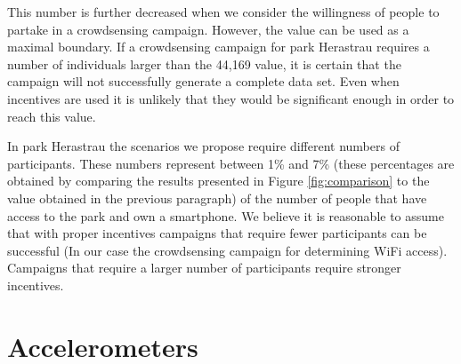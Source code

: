 This number is further decreased when we consider the willingness of people to partake in a crowdsensing campaign. However, the value can be used as a maximal boundary. If a crowdsensing campaign for park Herastrau requires a number of individuals larger than the 44,169 value, it is certain that the campaign will not successfully generate a complete data set. Even when incentives are used it is unlikely that they would be significant enough in order to reach this value.

In park Herastrau the scenarios we propose require different numbers of participants. These numbers represent between 1\% and 7\% (these percentages are obtained by comparing the results presented in Figure \ref{fig:comparison} to the value obtained in the previous paragraph) of the number of people that have access to the park and own a smartphone. We believe it is reasonable to assume that with proper incentives campaigns that require fewer participants can be successful (In our case the crowdsensing campaign for determining WiFi access). Campaigns that require a larger number of participants require stronger incentives.

\section{Accelerometers}
\label{sec:res-acc}
